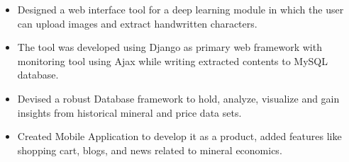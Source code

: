 \documentclass[10pt,a4paper,ragged2e]{altacv}
\begin{document}

\begin{fullwidth}
\makecvheader
\end{fullwidth}



\begin{itemize}
\item  Designed a web interface tool for a deep learning module in which the user can upload images and extract handwritten characters.
\item The tool was developed using Django as primary web framework with monitoring tool using Ajax while writing extracted contents to MySQL database.

\end{itemize}

\divider

\begin{itemize}
\item  Devised a robust Database framework to hold, analyze, visualize and gain insights from historical mineral and price data sets.  
\item Created Mobile Application to develop it as a product, added features like shopping cart, blogs, and news related to mineral economics.
\end{itemize}
\divider
\end{document}
